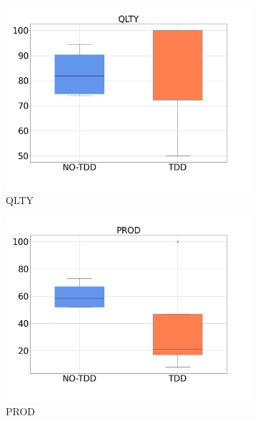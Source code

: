 \begin{figure}[H]
    \centering
    \begin{subfigure}{0.33\textwidth}
        \includegraphics[width=\linewidth]{figures/box_plots/task2/QLTY.png}
        \caption{QLTY}
        \label{bp_task2_qlty}
    \end{subfigure}\hfil
        \begin{subfigure}{0.33\textwidth}
        \includegraphics[width=\linewidth]{figures/box_plots/task2/PROD.png}
        \caption{PROD}
        \label{bp_task2_prod}
    \end{subfigure}\hfil
    \begin{subfigure}{0.33\textwidth}

\end{subfigure}
\end{figure}
